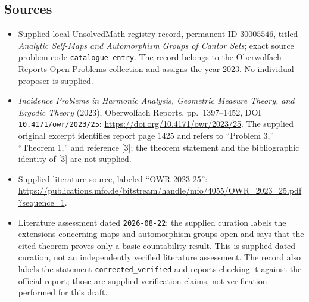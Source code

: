 \documentclass[11pt]{article}
\begin{document}
\subsection{Sources}
\begin{itemize}
\item Supplied local UnsolvedMath registry record, permanent ID \(30005546\), titled \emph{Analytic Self-Maps and Automorphism Groups of Cantor Sets}; exact source problem code \texttt{catalogue entry}. The record belongs to the Oberwolfach Reports Open Problems collection and assigns the year 2023. No individual proposer is supplied.
\item \emph{Incidence Problems in Harmonic Analysis, Geometric Measure Theory, and Ergodic Theory} (2023), Oberwolfach Reports, pp.~1397--1452, DOI \texttt{10.4171/owr/2023/25}: \url{https://doi.org/10.4171/owr/2023/25}. The supplied original excerpt identifies report page 1425 and refers to ``Problem 3,'' ``Theorem 1,'' and reference [3]; the theorem statement and the bibliographic identity of [3] are not supplied.
\item Supplied literature source, labeled ``OWR 2023 25'': \url{https://publications.mfo.de/bitstream/handle/mfo/4055/OWR_2023_25.pdf?sequence=1}.
\item Literature assessment dated \texttt{2026-08-22}: the supplied curation labels the extensions concerning maps and automorphism groups open and says that the cited theorem proves only a basic countability result. This is supplied dated curation, not an independently verified literature assessment. The record also labels the statement \texttt{corrected\_verified} and reports checking it against the official report; those are supplied verification claims, not verification performed for this draft.
\end{itemize}
\end{document}
